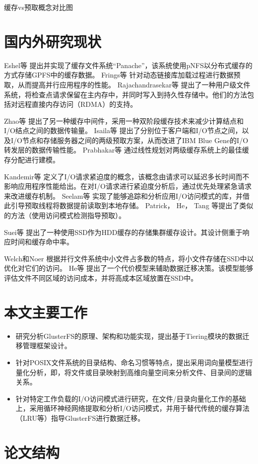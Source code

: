 {\color{red}缓存vs预取概念对比图}

\section{国内外研究现状}
Eshel等\cite{Panache}
提出并实现了缓存文件系统“Panache”，该系统使用pNFS以分布式缓存的方式存储GPFS中的缓存数据。
Frings等\cite{Massively_Parallel_Loading}
针对动态链接库加载过程进行数据预取，从而提高并行应用程序的性能。
Rajachandrasekar等\cite{1PB}
提出了一种用户级文件系统，将检查点请求保留在主内存中，并同时写入到持久性存储中。他们的方法包括对远程直接内存访问（RDMA）的支持。

Zhao等\cite{HyCache+}
提出了另一种缓存中间件，采用一种双阶段缓存技术来减少计算结点和I/O结点之间的数据传输量。
Isaila等\cite{Multi_Leve_Data_Staging_for_Blue_Gene}
提出了分别位于客户端和I/O节点之间，以及I/O节点和存储服务器之间的两级预取方案，从而改进了IBM Blue Gene的I/O转发层的数据传输性能。
Prabhakar等\cite{Adaptive_Multi_level_Cache_Allocation_in_Distribute_Storage_Architectures}
通过线性规划对两级缓存系统上的最佳缓存分配进行建模。

Kandemir等\cite{On_Urgency_of_I/O_Operations}
定义了I/O请求紧迫度的概念，该概念由请求可以延迟多长时间而不影响应用程序性能给出。在对I/O请求进行紧迫度分析后，通过优先处理紧急请求来改进缓存机制。
Seelam等\cite{Masking_IO_latency_using_application_level_IO_caching_and_prefetching_on_Blue_Gene_systems}
实现了能够追踪和分析应用I/O访问模式的库，并借此引导预取线程将数据提前读取到本地存储。
Patrick\cite{Cashing_in_on_Hints_for_Better_Prefetching_and_Caching_in_PVFS_and_MPI_IO}，
He\cite{KNOWAC}，
Tang\cite{Improving_read_performance_with_online_access_pattern_analysis_and_prefetching}
等提出了类似的方法（使用访问模式检测指导预取）。


Suei等\cite{Endurance_Aware_Flash_Cache_Management_for_Storage_Servers}
提出了一种使用SSD作为HDD缓存的存储集群缓存设计。其设计侧重于响应时间和缓存命中率。 

Welch和Noer\cite{Optimizing_a_hybrid_SSD_HDD_HPC_storage_system_based_on_file_size_distributions}
根据并行文件系统中小文件占多数的特点，将小文件存储在SSD中以优化对它们的访问。
He等\cite{Proceedings_of_the_22nd_international_symposium_on_High_performance_parallel_and_distributed_computing}
提出了一个代价模型来辅助数据迁移决策。该模型能够评估文件不同区域的访问成本，并将高成本区域放置在SSD中。

\section{本文主要工作}
\begin{itemize}
    \item 研究分析GlusterFS的原理、架构和功能实现，提出基于Tiering模块的数据迁移管理框架设计。
    \item 针对POSIX文件系统的目录结构、命名习惯等特点，提出采用词向量模型进行量化分析，即，将文件或目录映射到高维向量空间来分析文件、目录间的逻辑关系。
    \item 针对特定工作负载的I/O访问模式进行研究，在文件/目录向量化工作的基础上，采用循环神经网络提取和分析I/O访问模式，并用于替代传统的缓存算法（LRU等）指导GlusterFS进行数据迁移。
\end{itemize}
\section{论文结构}